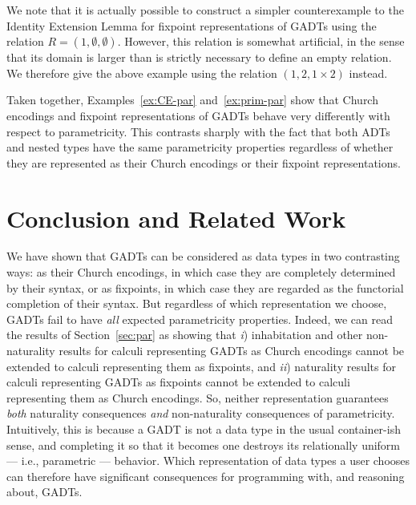 \documentclass[submission,copyright,creativecommons]{eptcs}
\begin{document}
\vspace*{-0.05in}

We note that it is actually possible to construct a simpler
counterexample to the Identity Extension Lemma for fixpoint
representations of GADTs using the relation $R = (1,\emptyset,
\emptyset)$. However, this relation is somewhat artificial, in the
sense that its domain is larger than is strictly necessary to define
an empty relation. We therefore give the above example using the
relation $(1,2,1 \times 2)$ instead.

Taken together, Examples~\ref{ex:CE-par} and~\ref{ex:prim-par} show
that Church encodings and fixpoint representations of GADTs behave
very differently with respect to parametricity.  This contrasts
sharply with the fact that both ADTs and nested types have the same
parametricity properties regardless of whether they are represented as
their Church encodings or their fixpoint representations.

\section{Conclusion and Related Work}

We have shown that GADTs can be considered as data types in two
contrasting ways: as their Church encodings, in which case they are
completely determined by their syntax, or as fixpoints, in which case
they are regarded as the functorial completion of their syntax. But
regardless of which representation we choose, GADTs fail to have {\em
  all} expected parametricity properties.  Indeed, we can read the
results of Section~\ref{sec:par} as showing that {\em i}) inhabitation
and other non-naturality results for calculi representing GADTs as
Church encodings cannot be extended to calculi representing them as
fixpoints, and {\em ii}) naturality results for calculi representing
GADTs as fixpoints cannot be extended to calculi representing them as
Church encodings. So, neither representation guarantees {\em both}
naturality consequences {\em and} non-naturality consequences of
parametricity. Intuitively, this is because a GADT is not a data type
in the usual container-ish sense, and completing it so that it becomes
one destroys its relationally uniform --- i.e., parametric ---
behavior.  Which representation of data types a user chooses can
therefore have significant consequences for programming with, and
reasoning about, GADTs.
\end{document}
